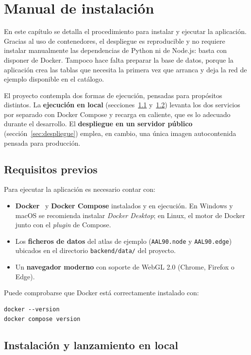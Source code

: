 \chapter{Manual de instalación}

En este capítulo se detalla el procedimiento para instalar y ejecutar la aplicación. Gracias al uso
de contenedores, el despliegue es reproducible y no requiere instalar manualmente las dependencias
de Python ni de Node.js: basta con disponer de Docker. Tampoco hace falta preparar la base de datos,
porque la aplicación crea las tablas que necesita la primera vez que arranca y deja la red de
ejemplo disponible en el catálogo.

El proyecto contempla dos formas de ejecución, pensadas para propósitos distintos. La
\textbf{ejecución en local} (secciones~\ref{sec:requisitos} y~\ref{sec:lanzamiento}) levanta los dos
servicios por separado con Docker Compose y recarga en caliente, que es lo adecuado durante el
desarrollo. El \textbf{despliegue en un servidor público} (sección~\ref{sec:despliegue}) emplea, en
cambio, una única imagen autocontenida pensada para producción.

\section{Requisitos previos}
\label{sec:requisitos}

Para ejecutar la aplicación es necesario contar con:

\begin{itemize}
	\item \textbf{Docker}~\cite{docker} y \textbf{Docker Compose} instalados y en ejecución. En Windows y macOS
		se recomienda instalar \textit{Docker Desktop}; en Linux, el motor de Docker junto con el
		\textit{plugin} de Compose.
	\item Los \textbf{ficheros de datos} del atlas de ejemplo (\texttt{AAL90.node} y
		\texttt{AAL90.edge}) ubicados en el directorio \texttt{backend/data/} del proyecto.
	\item Un \textbf{navegador moderno} con soporte de WebGL 2.0 (Chrome, Firefox o Edge).
\end{itemize}

Puede comprobarse que Docker está correctamente instalado con:

\begin{verbatim}
docker --version
docker compose version
\end{verbatim}

\section{Instalación y lanzamiento en local}
\label{sec:lanzamiento}

